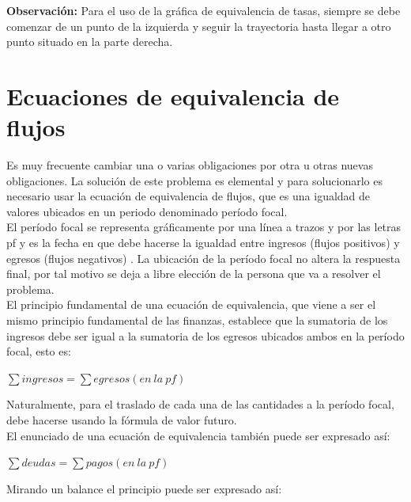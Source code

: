 \textbf{Observación:} Para el uso de la gráfica de equivalencia de tasas, siempre se debe comenzar de un punto de la izquierda y seguir la trayectoria hasta llegar a otro punto situado en la parte derecha.\\








\section{Ecuaciones de equivalencia de flujos}
Es muy frecuente cambiar una o varias obligaciones por otra u otras nuevas obligaciones. La solución de este problema es elemental y para solucionarlo es necesario usar la ecuación de equivalencia de flujos, que es una igualdad de valores ubicados en un periodo denominado período focal.\\
El período focal se representa gráficamente por una línea a trazos y por las letras pf y es la fecha en que debe hacerse la igualdad entre ingresos (flujos positivos) y egresos (flujos negativos) . La ubicación de la período focal no altera la respuesta final, por tal motivo se deja a libre elección de la persona que va a resolver el problema.\\
El principio fundamental de una ecuación de equivalencia, que viene a ser el mismo principio fundamental de las finanzas, establece que la sumatoria de los ingresos debe ser igual a la sumatoria de los egresos ubicados ambos en la período focal, esto es:

\begin{center}
   $\sum ingresos = \sum egresos(en\ la\ pf)$\\
\end{center}
Naturalmente, para el traslado de cada una de las cantidades a la período focal, debe hacerse usando la fórmula de valor futuro.\\
El enunciado de una ecuación de equivalencia también puede ser expresado así:

\begin{center}
   $\sum deudas = \sum pagos(en\ la\ pf)$\\
\end{center}

Mirando un balance el principio puede ser expresado así:\\

